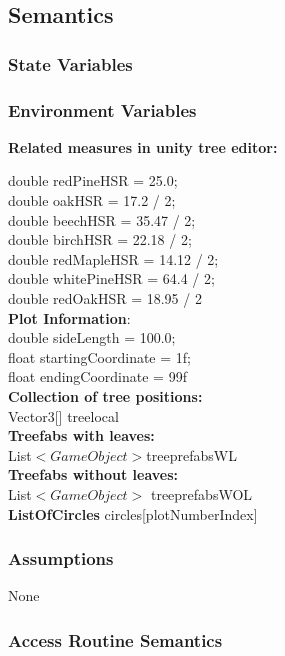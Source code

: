\documentclass[12pt, titlepage]{article}
\begin{document}
\subsection{Semantics}

\subsubsection{State Variables}


\subsubsection{Environment Variables}
\textbf{Related measures in unity tree editor:}

\noindent double redPineHSR = 25.0;\\
double oakHSR = 17.2 / 2;\\
double beechHSR = 35.47 / 2;\\
double birchHSR = 22.18 / 2;\\
double redMapleHSR = 14.12 / 2;   \\
double whitePineHSR = 64.4 / 2;\\
double redOakHSR = 18.95 / 2\\

\noindent\textbf{Plot Information}:\\
double sideLength = 100.0;\\
float startingCoordinate = 1f;\\
float endingCoordinate = 99f\\

\noindent\textbf{Collection of tree positions:}\\
Vector3[] treelocal\\

\noindent\textbf{Treefabs with leaves:}\\
List$<GameObject>$treeprefabsWL\\

\noindent\textbf{Treefabs without leaves:}\\
List$<GameObject>$ treeprefabsWOL\\

\noindent \textbf{ListOfCircles}
circles[plotNumberIndex]\\


\subsubsection{Assumptions}
None
\subsubsection{Access Routine Semantics}
\end{document}
